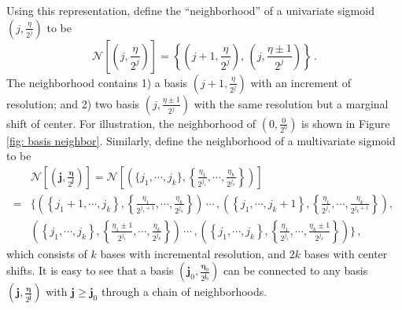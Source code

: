 Using this representation, define the ``neighborhood'' of a univariate sigmoid 
$(j,\frac{\eta}{2^j})$ to be 
\begin{equation}
    \mathcal{N}\left[ \left(j,\frac{\eta}{2^j}\right) \right]
    = \left\{ 
        \left( j+1, \frac{\eta}{2^j} \right),\,
        \left( j, \frac{\eta\pm 1}{2^j} \right)
    \right\}\,.
    \label{eqn: neighborhood 1D}
\end{equation}
The neighborhood contains 1) a basis 
$\left( j+1, \frac{\eta}{2^j} \right)$ 
with an increment of resolution; and
2) two basis $\left( j, \frac{\eta\pm 1}{2^j} \right)$
with the same resolution but a marginal shift of center.
For illustration, the neighborhood of $\left(0,\frac{0}{2^0}\right)$
is shown in Figure \ref{fig: basis neighbor}.
Similarly, define the neighborhood of a multivariate sigmoid to be
\begin{equation}\begin{split}
    &\mathcal{N}
    \left[
         \left(
               \boldsymbol{j}, \frac{\boldsymbol{\eta}}{2^{\boldsymbol{j}}}
         \right)
    \right] = 
    \mathcal{N}\left[ \left(\{j_1, \cdots, j_k\} , \left\{
    \frac{\eta_1}{2^{j_1}}, \cdots, \frac{\eta_k}{2^{j_k}} \right\} \right) \right]\\
    = & \bigg\{
            \left( \left\{ j_1+1,\cdots, j_k\right\},
                   \left\{ \frac{\eta_1}{2^{j_1+1}}, \cdots, \frac{\eta_k}{2^{j_k}} \right\}
            \right) \, \cdots \, ,
            \left( \left\{ j_1,\cdots, j_k+1\right\},
                   \left\{ \frac{\eta_1}{2^{j_1}}, \cdots, \frac{\eta_k}{2^{j_k+1}} \right\}
            \right),\,   \\
          & 
            \left( \left\{ j_1,\cdots, j_k\right\},
                   \left\{ \frac{\eta_1\pm 1}{2^{j_1}}, \cdots, \frac{\eta_k}{2^{j_k}} \right\}
            \right) \, \cdots \, ,
            \left( \left\{ j_1,\cdots, j_k\right\},
                   \left\{ \frac{\eta_1}{2^{j_1}}, \cdots, \frac{\eta_k\pm 1}{2^{j_k}} \right\}
            \right) \bigg\}\,,
    \label{eqn: neighborhood kD}
\end{split}\end{equation}
which consists of $k$ bases with incremental resolution, and $2k$ bases with center shifts.
It is easy to see that a basis $(\boldsymbol{j}_0, \frac{\boldsymbol{\eta}_0}{2^{\boldsymbol{j}_0}})$ 
can be connected to any basis $(\boldsymbol{j}, \frac{\boldsymbol{\eta}}{2^{\boldsymbol{j}}})$ 
with $\boldsymbol{j} \ge \boldsymbol{j}_0$ through a chain
of neighborhoods.
